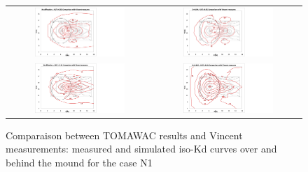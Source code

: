 \begin{figure}[H]
  \centering
\begin{tabular}{cc}
    \includegraphics[width=0.65\textwidth]{iso-Kd_nodiff_dx035.jpg}& \hspace{-3cm}
    \includegraphics[width=0.65\textwidth]{iso-Kd_cr004-dx035.jpg}\\
    \includegraphics[width=0.65\textwidth]{iso-Kd_nodiff_dx018.jpg}& \hspace{-3cm}
    \includegraphics[width=0.65\textwidth]{iso-Kd_cr0015_dx018.jpg}\\
    \end{tabular}

      \caption{Comparaison between TOMAWAC results and Vincent measurements: measured and simulated iso-Kd curves over and behind the mound for the case N1}
\end{figure}


